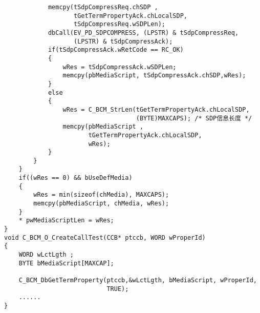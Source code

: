 ﻿\documentclass  [11pt,twocolumn,landscape]{article}
\begin{document}
\begin{lstlisting}
			memcpy(tSdpCompressReq.chSDP ,
                   tGetTermPropertyAck.chLocalSDP,
                   tSdpCompressReq.wSDPLen);
			dbCall(EV_PD_SDPCOMPRESS, (LPSTR) & tSdpCompressReq,
                   (LPSTR) & tSdpCompressAck);
			if(tSdpCompressAck.wRetCode == RC_OK)
			{
				wRes = tSdpCompressAck.wSDPLen;
				memcpy(pbMediaScript, tSdpCompressAck.chSDP,wRes);
			}
			else
			{
                wRes = C_BCM_StrLen(tGetTermPropertyAck.chLocalSDP,
                                    (BYTE)MAXCAPS); /* SDP信息长度 */
				memcpy(pbMediaScript ,
                       tGetTermPropertyAck.chLocalSDP,
                       wRes);
			}
		}
	}
	if((wRes == 0) && bUseDefMedia)
	{
		wRes = min(sizeof(chMedia), MAXCAPS);
		memcpy(pbMediaScript, chMedia, wRes);
	}
	* pwMediaScriptLen = wRes;
}
void C_BCM_O_CreateCallTest(CCB* ptccb, WORD wProperId)
{
    WORD wLctLgth ;
    BYTE bMediaScript[MAXCAP];
    
    C_BCM_DbGetTermProperty(ptccb,&wLctLgth, bMediaScript, wProperId,
                            TRUE);
    ......
}
\end{lstlisting}
\pagebreak
\end{document}
